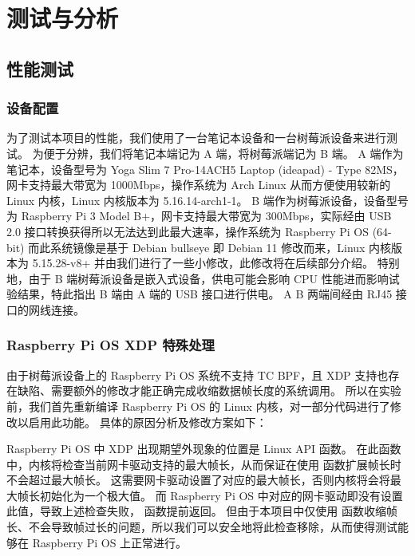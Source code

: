 

\chapter{测试与分析}

\section{性能测试}

\subsection{设备配置}

为了测试本项目的性能，我们使用了一台笔记本设备和一台树莓派设备来进行测试。
为便于分辨，我们将笔记本端记为 A 端，将树莓派端记为 B 端。
A 端作为笔记本，设备型号为 Yoga Slim 7 Pro-14ACH5 Laptop (ideapad) - Type 82MS，网卡支持最大带宽为 1000Mbps，操作系统为 Arch Linux 从而方便使用较新的 Linux 内核，Linux 内核版本为 5.16.14-arch1-1。
B 端作为树莓派设备，设备型号为 Raspberry Pi 3 Model B+，网卡支持最大带宽为 300Mbps，实际经由 USB 2.0 接口转换获得所以无法达到此最大速率，操作系统为 Raspberry Pi OS (64-bit) 而此系统镜像是基于 Debian bullseye 即 Debian 11 修改而来，Linux 内核版本为 5.15.28-v8+ 并由我们进行了一些小修改，此修改将在后续部分介绍。
特别地，由于 B 端树莓派设备是嵌入式设备，供电可能会影响 CPU 性能进而影响试验结果，特此指出 B 端由 A 端的 USB 接口进行供电。
A B 两端间经由 RJ45 接口的网线连接。

\subsection{Raspberry Pi OS XDP 特殊处理}

由于树莓派设备上的 Raspberry Pi OS 系统不支持 TC BPF，且 XDP 支持也存在缺陷、需要额外的修改才能正确完成收缩数据帧长度的系统调用。
所以在实验前，我们首先重新编译 Raspberry Pi OS 的 Linux 内核，对一部分代码进行了修改以启用此功能。
具体的原因分析及修改方案如下：

Raspberry Pi OS 中 XDP 出现期望外现象的位置是 Linux API  函数。
在此函数中，内核将检查当前网卡驱动支持的最大帧长，从而保证在使用  函数扩展帧长时不会超过最大帧长。
这需要网卡驱动设置了对应的最大帧长，否则内核将会将最大帧长初始化为一个极大值。
而 Raspberry Pi OS 中对应的网卡驱动即没有设置此值，导致上述检查失败， 函数提前返回。
但由于本项目中仅使用  函数收缩帧长、不会导致帧过长的问题，所以我们可以安全地将此检查移除，从而使得测试能够在 Raspberry Pi OS 上正常进行。

